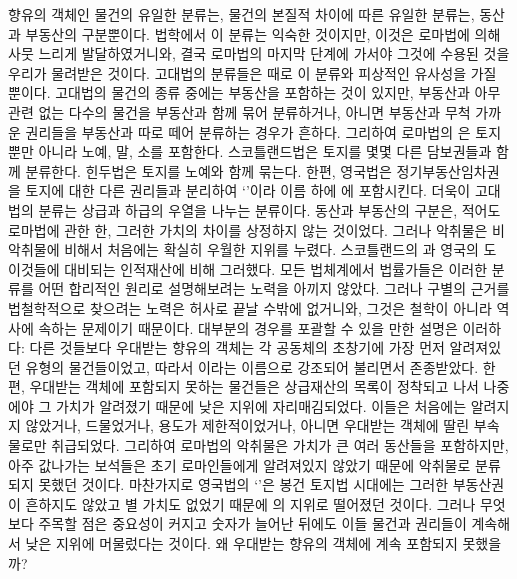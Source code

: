 향유의 객체인 물건의 유일한  분류는,
물건의 본질적 차이에 따른 유일한 분류는,
동산과 부동산의 구분뿐이다.
법학에서 이 분류는 익숙한 것이지만,
이것은 로마법에 의해 사뭇 느리게 발달하였거니와,
결국 로마법의 마지막 단계에 가서야 그것에 수용된 것을
우리가 물려받은 것이다.
고대법의 분류들은 때로 이 분류와 피상적인 유사성을 가질 뿐이다.
고대법의 물건의 종류 중에는 부동산을 포함하는 것이 있지만,
부동산과 아무 관련 없는 다수의 물건을
부동산과 함께
묶어 분류하거나,
아니면
부동산과 무척 가까운 권리들을 부동산과 따로 떼어 분류하는 경우가 흔하다.
그리하여
로마법의 은 토지뿐만 아니라 노예, 말, 소를 포함한다.
스코틀랜드법은 토지를 몇몇 다른 담보권들과 함께 분류한다.
힌두법은 토지를 노예와 함께 묶는다.
%
한편, 영국법은 정기부동산임차권을
토지에 대한 다른 권리들과 분리하여
`'이라 이름 하에
에 포함시킨다.
더욱이 고대법의 분류는 상급과 하급의 우열을 나누는 분류이다.
동산과 부동산의 구분은,
적어도 로마법에 관한 한,
그러한 가치의 차이를 상정하지 않는 것이었다.
그러나
악취물은 비악취물에 비해서 처음에는 확실히 우월한 지위를 누렸다.
스코틀랜드의 과
영국의 도 이것들에 대비되는 인적재산에 비해 그러했다.
모든 법체계에서 법률가들은
이러한 분류를 어떤 합리적인 원리로 설명해보려는
노력을 아끼지 않았다.
그러나 구별의 근거를 법철학적으로 찾으려는 노력은 허사로 끝날 수밖에
없거니와,
그것은 철학이 아니라 역사에 속하는 문제이기 때문이다.
대부분의 경우를 포괄할 수 있을 만한 설명은 이러하다:
다른 것들보다 우대받는 향유의 객체는
각 공동체의 초창기에 가장 먼저 알려져있던 유형의 물건들이었고,
따라서 이라는 이름으로 강조되어
불리면서 존종받았다.
한편, 우대받는 객체에 포함되지 못하는 물건들은
상급재산의 목록이 정착되고 나서 나중에야
그 가치가 알려졌기 때문에 낮은 지위에 자리매김되었다.
이들은 처음에는 알려지지 않았거나, 드물었거나, 용도가 제한적이었거나,
아니면 우대받는 객체에 딸린 부속물로만 취급되었다.
그리하여 로마법의 악취물은 가치가 큰 여러 동산들을 포함하지만,
아주 값나가는 보석들은
초기 로마인들에게 알려져있지 않았기 때문에
악취물로 분류되지 못했던 것이다.
마찬가지로 영국법의 `'은
봉건 토지법 시대에는 그러한 부동산권이 흔하지도 않았고
별 가치도 없었기 때문에 의 지위로 떨어졌던 것이다.
그러나
무엇보다 주목할 점은
중요성이 커지고 숫자가 늘어난 뒤에도
이들 물건과 권리들이 계속해서 낮은 지위에 머물렀다는 것이다.
왜 우대받는 향유의 객체에 계속 포함되지 못했을까?
